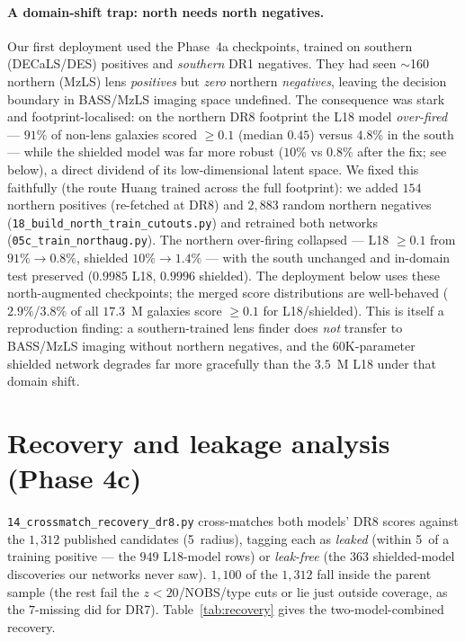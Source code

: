 \documentclass[11pt,letterpaper]{article}
\begin{document}
\paragraph{A domain-shift trap: north needs north negatives.} Our first
deployment used the Phase~4a checkpoints, trained on southern (DECaLS/DES)
positives and \emph{southern} DR1 negatives. They had seen $\sim$160 northern
(MzLS) lens \emph{positives} but \emph{zero} northern \emph{negatives}, leaving
the decision boundary in BASS/MzLS imaging space undefined. The consequence was
stark and footprint-localised: on the northern DR8 footprint the L18 model
\emph{over-fired} --- $91\%$ of non-lens galaxies scored $\ge0.1$ (median
$0.45$) versus $4.8\%$ in the south --- while the shielded model was far more
robust ($10\%$ vs $0.8\%$ after the fix; see below), a direct dividend of its
low-dimensional latent space. We fixed this faithfully (the route Huang trained
across the full footprint): we added $154$ northern positives (re-fetched at
DR8) and $2{,}883$ random northern negatives (\texttt{18\_build\_north\_train\_cutouts.py})
and retrained both networks (\texttt{05c\_train\_northaug.py}). The northern
over-firing collapsed --- L18 $\ge0.1$ from $91\%\to0.8\%$, shielded
$10\%\to1.4\%$ --- with the south unchanged and in-domain test \AUC{} preserved
($0.9985$ L18, $0.9996$ shielded). The deployment below uses these
north-augmented checkpoints; the merged score distributions are well-behaved
($2.9\%$/$3.8\%$ of all $17.3$~M galaxies score $\ge0.1$ for L18/shielded).
This is itself a reproduction finding: a southern-trained lens finder does
\emph{not} transfer to BASS/MzLS imaging without northern negatives, and the
$60$K-parameter shielded network degrades far more gracefully than the $3.5$~M
L18 under that domain shift.

\section{Recovery and leakage analysis (Phase 4c)}
\label{sec:recovery}

\texttt{14\_crossmatch\_recovery\_dr8.py} cross-matches both models' DR8 scores
against the $1{,}312$ published candidates (5\arcsec\ radius), tagging each as
\emph{leaked} (within 5\arcsec\ of a training positive --- the $949$ L18-model
rows) or \emph{leak-free} (the $363$ shielded-model discoveries our networks
never saw). $1{,}100$ of the $1{,}312$ fall inside the parent sample (the rest
fail the $z<20$/NOBS/type cuts or lie just outside coverage, as the $7$-missing
did for DR7). Table~\ref{tab:recovery} gives the two-model-combined recovery.
\end{document}
